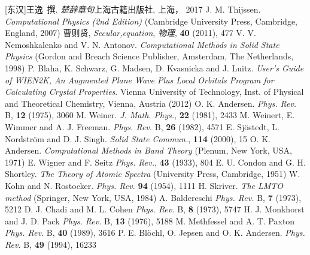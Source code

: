 {\begin{thebibliography}{99}
{	[东汉]王逸~撰. \textit{楚辞章句}\:上海古籍出版社, 上海， 2017
	\textrm{J. M. Thijssen. \textit{Computational Physics (2nd Edition)} (Cambridge University Press, Cambridge, England, 2007)}
	曹则贤, \textit{Secular,equation}, \textit{物理}, \textbf{40} \textrm{(2011), 477}
	\textrm{V. V. Nemoshkalenko and V. N. Antonov. \textit{Computational Methods in Solid State Physics} (Gordon and Breach Science Publisher, Amsterdam, The Netherlands, 1998)}
	\textrm{P. Blaha, K. Schwarz, G. Madsen, D. Kvasnicka and J. Luitz. \textit{User's Guide of WIEN2K, An Augmented Plane Wave Plus Local Orbitals Program for Calculating Crystal Properties}. Vienna University of Technology, Inst. of Physical and Theoretical Chemistry, Vienna, Austria (2012)}
	\textrm{O. K. Andersen. \textit{Phys. Rev.} B, \textbf{12} (1975), 3060}
	\textrm{M. Weiner. \textit{J. Math. Phys.}, \textbf{22} (1981), 2433}
	\textrm{M. Weinert, E. Wimmer and A. J. Freeman. \textit{Phys. Rev.} B, \textbf{26} (1982), 4571}
	\textrm{E. Sj\"ostedt, L. Nordstr\"om and D. J. Singh. \textit{Solid State Commun.}, \textbf{114} (2000), 15}
	\textrm{O. K. Andersen. \textit{Computational Methods in Band Theory} (Plenum, New York, USA, 1971)}
	\textrm{E. Wigner and F. Seitz \textit{Phys. Rev.}, \textbf{43} (1933), 804}
	\textrm{E. U. Condon and G. H. Shortley. \textit{The Theory of Atomic Spectra} (University Press, Cambridge, 1951)}
	\textrm{W. Kohn and N. Rostocker. \textit{Phys. Rev.} \textbf{94} (1954), 1111}
	\textrm{H. Skriver. \textit{The LMTO method} (Springer, New York, USA, 1984)}
	\textrm{A. Baldereschi \textit{Phys. Rev.} B, \textbf{7} (1973), 5212}
	\textrm{D. J. Chadi and M. L. Cohen \textit{Phys. Rev.} B, \textbf{8} (1973), 5747}
	\textrm{H. J. Monkhorst and J. D. Pack \textit{Phys. Rev.} B, \textbf{13} (1976), 5188}
	\textrm{M. Methfessel and A. T. Paxton \textit{Phys. Rev.} B, \textbf{40} (1989), 3616}
	\textrm{P. E. Bl\"ochl, O. Jepsen and O. K. Andersen. \textit{Phys. Rev.} B, \textbf{49} (1994), 16233}
}
\end{thebibliography}}
